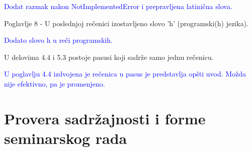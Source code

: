 \documentclass[a4paper]{report}
\newcommand{\odgovor}[1]{\textcolor{blue}{#1}}
\begin{document}
\odgovor{
Dodat razmak nakon NotImplementedError i prepravljena latinična slova.
}

Poglavlje 8 - U poslednjoj re\v cenici izostavljeno slovo 'h' (programski(h) jezika).

\odgovor{
Dodato slovo h u reči programskih.
}

U delovima 4.4 i 5.3 postoje pasusi koji sadr\v ze samo jednu re\v cenicu.

\odgovor{
U poglavlju 4.4 izdvojena je rečenica u pasus je predstavlja opšti uvod. Možda nije efektivno, pa je promenjeno. 
}

\section{Provera sadržajnosti i forme seminarskog rada}
\end{document}
